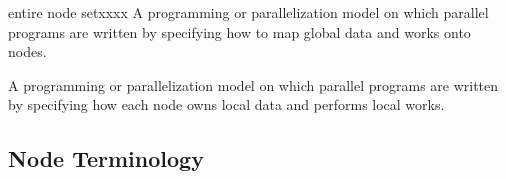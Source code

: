 \begin{namelist}{entire node setxxxx}
 A programming or parallelization model on which parallel programs
 are written by specifying how to map global data and works onto nodes.


 A programming or parallelization model on which parallel programs
 are written by specifying how each node owns local data and performs local
 works.


%

\end{namelist}


\subsection{Node Terminology}\label{sub:nodeTerminology}

